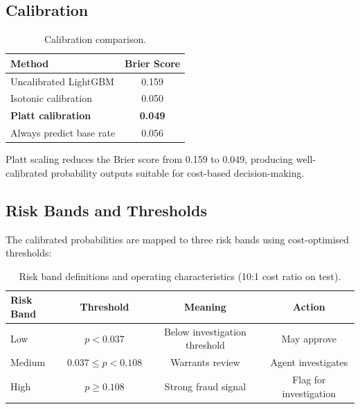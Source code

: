 \documentclass[12pt,a4paper]{article}
\begin{document}
\subsection{Calibration}

\begin{table}[H]
\centering
\caption{Calibration comparison.}
\label{tab:calibration}
\begin{tabular}{@{}lc@{}}
\toprule
\textbf{Method} & \textbf{Brier Score} \\
\midrule
Uncalibrated LightGBM     & 0.159 \\
Isotonic calibration       & 0.050 \\
\textbf{Platt calibration} & \textbf{0.049} \\
Always predict base rate   & 0.056 \\
\bottomrule
\end{tabular}
\end{table}

Platt scaling reduces the Brier score from 0.159 to 0.049, producing well-calibrated probability outputs suitable for cost-based decision-making.

\subsection{Risk Bands and Thresholds}

The calibrated probabilities are mapped to three risk bands using cost-optimised thresholds:

\begin{table}[H]
\centering
\caption{Risk band definitions and operating characteristics (10:1 cost ratio on test).}
\label{tab:riskbands}
\begin{tabular}{@{}lccc@{}}
\toprule
\textbf{Risk Band} & \textbf{Threshold} & \textbf{Meaning} & \textbf{Action} \\
\midrule
Low    & $p < 0.037$   & Below investigation threshold & May approve \\
Medium & $0.037 \leq p < 0.108$ & Warrants review & Agent investigates \\
High   & $p \geq 0.108$ & Strong fraud signal & Flag for investigation \\
\bottomrule
\end{tabular}
\end{table}


\newpage
\end{document}
